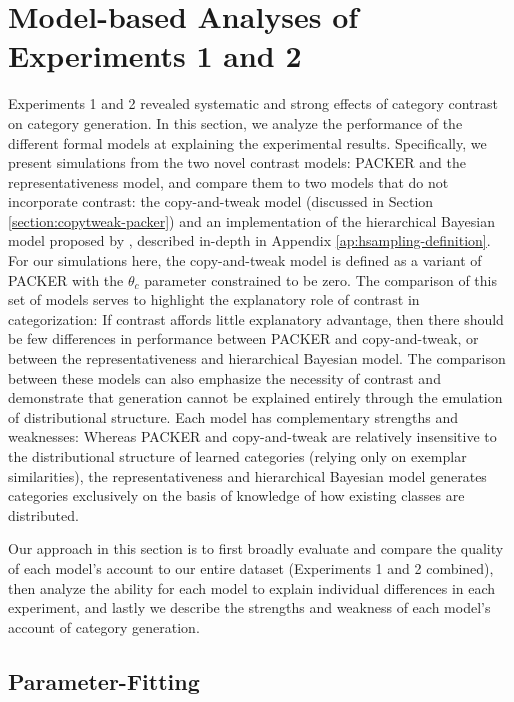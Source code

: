 \documentclass[pdflatex,sn-apa]{sn-jnl}%
\theoremstyle{thmstyleone}%
\theoremstyle{thmstyletwo}%
\theoremstyle{thmstylethree}%
\begin{document}
\section{Model-based Analyses of Experiments 1 and 2}

Experiments 1 and 2 revealed systematic and strong effects of category contrast
on category generation. In this section, we analyze the performance of the
different formal models at explaining the experimental results. Specifically, we
present simulations from the two novel contrast models: PACKER and the
representativeness model, and compare them to two models that do not incorporate
contrast: the copy-and-tweak model (discussed in Section
\ref{section:copytweak-packer}) and an implementation of the hierarchical
Bayesian model proposed by \cite{jern2013probabilistic}, described in-depth in
Appendix \ref{ap:hsampling-definition}. For our simulations here, the
copy-and-tweak model is defined as a variant of PACKER with the $\theta_c$
parameter constrained to be zero. The comparison of this set of models serves to
highlight the explanatory role of contrast in categorization: If contrast
affords little explanatory advantage, then there should be few differences in
performance between PACKER and copy-and-tweak, or between the representativeness
and hierarchical Bayesian model. The comparison between these models can also
emphasize the necessity of contrast and demonstrate that generation cannot be
explained entirely through the emulation of distributional structure. Each model
has complementary strengths and weaknesses: Whereas PACKER and copy-and-tweak
are relatively insensitive to the distributional structure of learned categories
(relying only on exemplar similarities), the representativeness and hierarchical
Bayesian model generates categories exclusively on the basis of knowledge of how
existing classes are distributed.

Our approach in this section is to first broadly evaluate and compare the
quality of each model's account to our entire dataset (Experiments 1 and 2
combined), then analyze the ability for each model to explain individual
differences in each experiment, and lastly we describe the strengths and
weakness of each model's account of category generation.

\subsection{Parameter-Fitting}
\end{document}
